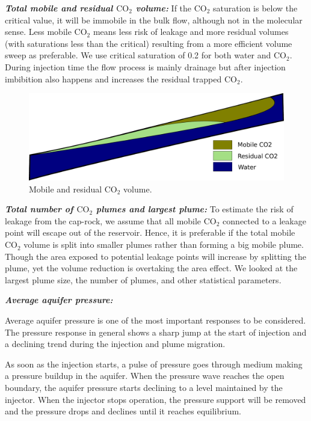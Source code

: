\textbf{\textit{Total mobile and residual $\mbox{CO}_2$ volume:}}
If the CO$_2$ saturation is below the critical value, it will be immobile in the
bulk flow, although not in the molecular sense. Less mobile CO$_2$ means less
risk of leakage and more residual volumes (with saturations less than the
critical) resulting from a more efficient volume sweep as preferable. We use critical saturation of 0.2 for both water and CO$_2$. During injection time the flow process is mainly drainage but after injection imbibition also happens and increases the residual trapped CO$_2$. 

\begin{figure}[thb]
  \centering
  \includegraphics[width=0.65 \linewidth]{./figurer/MobRes} 
  \caption{Mobile and residual CO$_2$ volume.}
  \label{fig:MobRes}
%
\end{figure}

\textbf{\textit{Total number of $\mbox{CO}_2$ plumes and largest plume:}}
To estimate the risk of leakage from the cap-rock, we assume that all mobile
CO$_2$ connected to a leakage point will escape out of the reservoir. Hence, it
is preferable if the total mobile CO$_2$ volume is split into smaller plumes
rather than forming a big mobile plume. Though the area exposed to potential
leakage points will increase by splitting the plume, yet the volume reduction is
overtaking the area effect. We looked at the largest plume size, the number of plumes, and other statistical parameters. 

% 

\textbf{\textit{Average aquifer pressure:}} 

Average aquifer pressure is one of the most important responses to be considered. The pressure response in general shows a sharp jump at the start of injection and a declining trend during the injection and plume migration.  

As soon as the injection starts, a pulse of pressure goes through medium making a pressure buildup in the aquifer. When the pressure wave reaches the open boundary, the aquifer pressure starts declining to a level maintained by the injector. When the injector stops operation, the pressure support will be removed and the pressure drops and declines until it reaches equilibrium.

